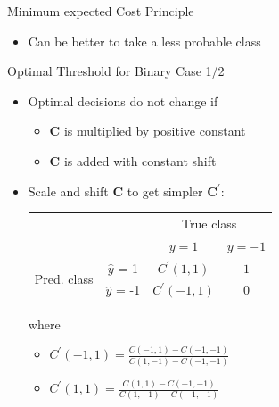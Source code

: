 \documentclass[11pt,compress,t,notes=noshow, xcolor=table]{beamer}
\begin{document}
\begin{frame}{Minimum expected Cost Principle}
\begin{itemize}
        \item Can be better to take a less probable class 

    \end{itemize}
\end{frame}


\begin{frame}{Optimal Threshold for Binary Case 1/2}
    \begin{itemize}
            \item Optimal decisions do not change if 
            \begin{itemize}
                \item $\mathbf{C}$ is multiplied by positive constant
                \item $\mathbf{C}$ is added with constant shift
            \end{itemize}

            \item Scale and shift $\mathbf{C}$ to get simpler $\mathbf{C}^\prime$: 
            \begin{table}[]
                \centering
                    \begin{tabular}{cc|cc}
        			& &\multicolumn{2}{c}{True class} \\
        			& & $y=1$ & $y=-1$  \\
        			\hline
        			\multirow{2}{*}{\parbox{0.5cm}{Pred.  class}} & $\hat y$ = 1 & $C^\prime(1,1)$ & $1$ \\
        			& $\hat y$ = -1 & $C^\prime(-1, 1)$ & 0\\
                \end{tabular}
            \end{table}
            where 
            \begin{itemize}
                \item $C^\prime (-1, 1) = \frac{C(-1, 1) - C(-1, -1)}{C(1, -1) - C(-1, -1)}$
                \item $C^\prime (1, 1) = \frac{C(1, 1) - C(-1, -1)}{C(1, -1) - C(-1,-1)}$
            \end{itemize}
    \end{itemize}
\end{frame}
\end{document}
